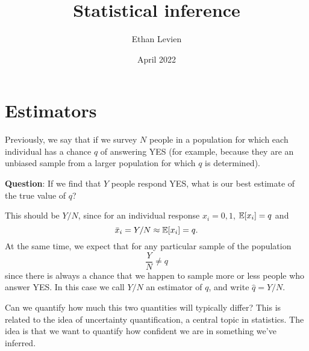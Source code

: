 

\title{\Huge \color{C1}  Statistical inference}
\author{Ethan Levien}
\date{April 2022}



\maketitle

\tableofcontents




\section{Estimators}
Previously, we say that if we survey $N$ people in a population for which each individual has a chance $q$ of answering YES (for example, because they are an unbiased sample from a larger population for which $q$ is determined). 

{\bf Question}: If we find that $Y$ people respond YES, what is our best estimate of the true value of $q$?

 This should be $Y/N$, since for an individual response $x_i =0,1$, $\mathbb E[x_i] = q$ and 
 \begin{equation}
 \bar{x}_i = Y/N \approx \mathbb E[x_i] = q. 
 \end{equation}
 At the same time, we expect that for any particular sample of the population 
\begin{equation}
\frac{Y}{N} \ne q
\end{equation}
since there is always a chance that we happen to sample more or less people who answer YES.  In this case we call $Y/N$ an {\dfn estimator} of $q$, and write $\hat{q} = Y/N$. 


Can we quantify how much this two quantities will typically differ? This is related to the idea of uncertainty quantification, a central topic in statistics. The idea is that we want to quantify how confident we are in something we've inferred. 





